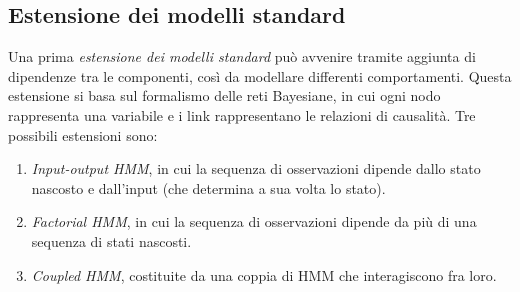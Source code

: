 \documentclass[a4paper,oneside,titlepage]{book}
\begin{document}
\subsection{Estensione dei modelli standard}
Una prima \textit{estensione dei modelli standard} può avvenire tramite aggiunta di dipendenze tra le componenti, così da modellare differenti comportamenti. Questa estensione si basa sul formalismo delle reti Bayesiane, in cui ogni nodo rappresenta una variabile e i link rappresentano le relazioni di causalità. Tre possibili estensioni sono:
\begin{enumerate}[label=(\alph*)]
    \item \textit{Input-output HMM}, in cui la sequenza di osservazioni dipende dallo stato nascosto e dall'input (che determina a sua volta lo stato).
    \item \textit{Factorial HMM}, in cui la sequenza di osservazioni dipende da più di una sequenza di stati nascosti.
    \item \textit{Coupled HMM}, costituite da una coppia di HMM che interagiscono fra loro.
\end{enumerate}
\end{document}
